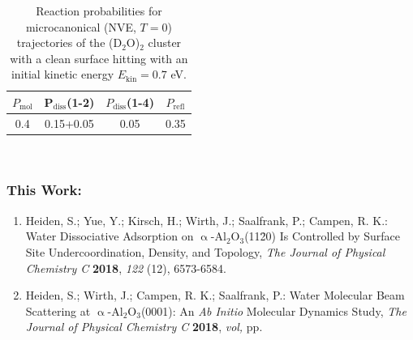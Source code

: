 \documentclass[11pt,DIV=13,BCOR=5mm,a4paper,headinclude]{scrbook}
\begin{document}
\begin{table}[!h]
 \centering
  \caption{Reaction probabilities for microcanonical (NVE, $T=0$) 
 trajectories of the (D$_2$O)$_2$ cluster with a clean surface 
 hitting with an initial kinetic energy $E_\textrm{kin}=0.7$ eV.}
 \begin{tabular}{cccc}
\toprule
$P_\textrm{mol}$ & P$_\textrm{diss}$(1-2) &  $P_\textrm{diss}$(1-4) & $P_\textrm{refl}$ \\\midrule
0.4&0.15+0.05 & 0.05&0.35\\\bottomrule
\end{tabular}
 \label{tab:2D2O-prob}
\end{table}

\begingroup
\renewcommand{\cleardoublepage}{}
~
\clearpage
~
\clearpage
{}
\endgroup

\subsubsection{This Work:}

\begin{enumerate}[itemsep=0.25\baselineskip]
  \item Heiden, S.; Yue, Y.; Kirsch, H.; Wirth, J.; Saalfrank, P.; Campen, R. K.: {\frqq}Water Dissociative Adsorption on $\upalpha$-Al$_2$O$_3$(11\=20) Is Controlled by Surface Site Undercoordination, Density, and Topology{\flqq}, \textit{The Journal of Physical Chemistry C} \textbf{2018}, \textit{122} (12), 6573-6584.
  \item Heiden, S.; Wirth, J.; Campen, R. K.; Saalfrank, P.: {\frqq}Water Molecular Beam Scattering at $\upalpha$-Al$_2$O$_3$(0001): An \textit{Ab Initio} Molecular Dynamics Study{\flqq}, \textit{The Journal of Physical Chemistry C} \textbf{2018}, \textit{vol,} pp.

\end{enumerate}
\end{document}
